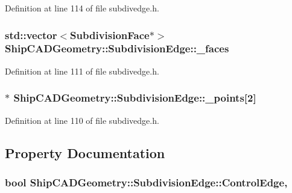 Definition at line 114 of file subdivedge.\-h.

\hypertarget{classShipCADGeometry_1_1SubdivisionEdge_af74c555a9f1e520c8a7092819182c565}{
\subsubsection[{\-\_\-faces}]{\setlength{\rightskip}{0pt plus 5cm}std\-::vector$<${\bf Subdivision\-Face}$\ast$$>$ Ship\-C\-A\-D\-Geometry\-::\-Subdivision\-Edge\-::\-\_\-faces\hspace{0.3cm}{\ttfamily [protected]}}}\label{classShipCADGeometry_1_1SubdivisionEdge_af74c555a9f1e520c8a7092819182c565}


Definition at line 111 of file subdivedge.\-h.

\hypertarget{classShipCADGeometry_1_1SubdivisionEdge_a1df486b149723fe19190b178897f9a27}{
\subsubsection[{\-\_\-points}]{$\ast$ Ship\-C\-A\-D\-Geometry\-::\-Subdivision\-Edge\-::\-\_\-points\mbox{[}2\mbox{]}\hspace{0.3cm}{\ttfamily [protected]}}}\label{classShipCADGeometry_1_1SubdivisionEdge_a1df486b149723fe19190b178897f9a27}


Definition at line 110 of file subdivedge.\-h.



\subsection{Property Documentation}
\hypertarget{classShipCADGeometry_1_1SubdivisionEdge_a2b11b00bcc223691e6e00c4b8db272b6}{
\subsubsection[{Control\-Edge}]{\setlength{\rightskip}{0pt plus 5cm}bool Ship\-C\-A\-D\-Geometry\-::\-Subdivision\-Edge\-::\-Control\-Edge\hspace{0.3cm}{\ttfamily [read]}, {\ttfamily [write]}}}\label{classShipCADGeometry_1_1SubdivisionEdge_a2b11b00bcc223691e6e00c4b8db272b6}


